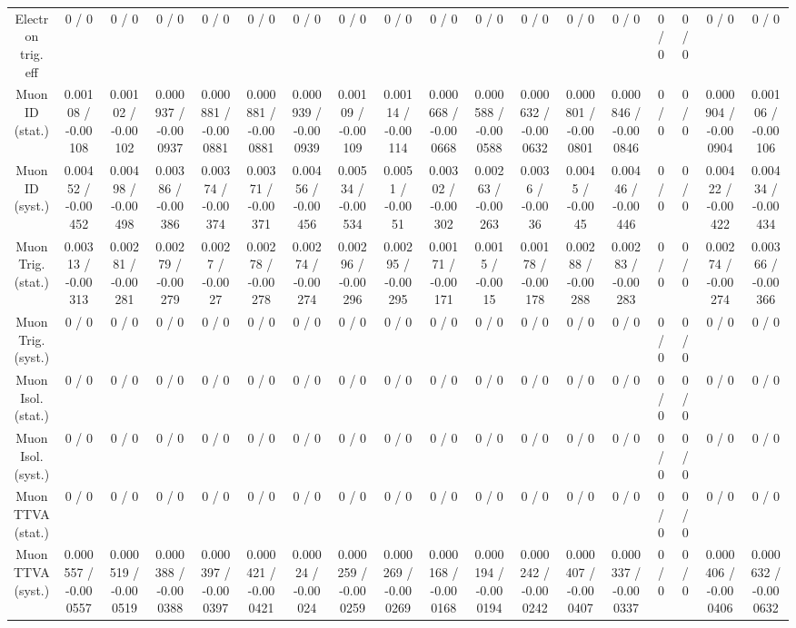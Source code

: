 \documentclass[10pt]{article}
\begin{document}
\begin{table}[htbp]
\begin{center}
\begin{tabular}{|c|c|c|c|c|c|c|c|c|c|c|c|c|c|c|c|c|c|}
  Electron trig. eff & 0 / 0 & 0 / 0 & 0 / 0 & 0 / 0 & 0 / 0 & 0 / 0 & 0 / 0 & 0 / 0 & 0 / 0 & 0 / 0 & 0 / 0 & 0 / 0 & 0 / 0 & 0 / 0 & 0 / 0 & 0 / 0 & 0 / 0 \\ 
  Muon ID (stat.) & 0.00108 / -0.00108 & 0.00102 / -0.00102 & 0.000937 / -0.000937 & 0.000881 / -0.000881 & 0.000881 / -0.000881 & 0.000939 / -0.000939 & 0.00109 / -0.00109 & 0.00114 / -0.00114 & 0.000668 / -0.000668 & 0.000588 / -0.000588 & 0.000632 / -0.000632 & 0.000801 / -0.000801 & 0.000846 / -0.000846 & 0 / 0 & 0 / 0 & 0.000904 / -0.000904 & 0.00106 / -0.00106 \\ 
  Muon ID (syst.) & 0.00452 / -0.00452 & 0.00498 / -0.00498 & 0.00386 / -0.00386 & 0.00374 / -0.00374 & 0.00371 / -0.00371 & 0.00456 / -0.00456 & 0.00534 / -0.00534 & 0.0051 / -0.0051 & 0.00302 / -0.00302 & 0.00263 / -0.00263 & 0.0036 / -0.0036 & 0.0045 / -0.0045 & 0.00446 / -0.00446 & 0 / 0 & 0 / 0 & 0.00422 / -0.00422 & 0.00434 / -0.00434 \\ 
  Muon Trig. (stat.) & 0.00313 / -0.00313 & 0.00281 / -0.00281 & 0.00279 / -0.00279 & 0.0027 / -0.0027 & 0.00278 / -0.00278 & 0.00274 / -0.00274 & 0.00296 / -0.00296 & 0.00295 / -0.00295 & 0.00171 / -0.00171 & 0.0015 / -0.0015 & 0.00178 / -0.00178 & 0.00288 / -0.00288 & 0.00283 / -0.00283 & 0 / 0 & 0 / 0 & 0.00274 / -0.00274 & 0.00366 / -0.00366 \\ 
  Muon Trig. (syst.) & 0 / 0 & 0 / 0 & 0 / 0 & 0 / 0 & 0 / 0 & 0 / 0 & 0 / 0 & 0 / 0 & 0 / 0 & 0 / 0 & 0 / 0 & 0 / 0 & 0 / 0 & 0 / 0 & 0 / 0 & 0 / 0 & 0 / 0 \\ 
  Muon Isol. (stat.) & 0 / 0 & 0 / 0 & 0 / 0 & 0 / 0 & 0 / 0 & 0 / 0 & 0 / 0 & 0 / 0 & 0 / 0 & 0 / 0 & 0 / 0 & 0 / 0 & 0 / 0 & 0 / 0 & 0 / 0 & 0 / 0 & 0 / 0 \\ 
  Muon Isol. (syst.) & 0 / 0 & 0 / 0 & 0 / 0 & 0 / 0 & 0 / 0 & 0 / 0 & 0 / 0 & 0 / 0 & 0 / 0 & 0 / 0 & 0 / 0 & 0 / 0 & 0 / 0 & 0 / 0 & 0 / 0 & 0 / 0 & 0 / 0 \\ 
  Muon TTVA (stat.) & 0 / 0 & 0 / 0 & 0 / 0 & 0 / 0 & 0 / 0 & 0 / 0 & 0 / 0 & 0 / 0 & 0 / 0 & 0 / 0 & 0 / 0 & 0 / 0 & 0 / 0 & 0 / 0 & 0 / 0 & 0 / 0 & 0 / 0 \\ 
  Muon TTVA (syst.) & 0.000557 / -0.000557 & 0.000519 / -0.000519 & 0.000388 / -0.000388 & 0.000397 / -0.000397 & 0.000421 / -0.000421 & 0.00024 / -0.00024 & 0.000259 / -0.000259 & 0.000269 / -0.000269 & 0.000168 / -0.000168 & 0.000194 / -0.000194 & 0.000242 / -0.000242 & 0.000407 / -0.000407 & 0.000337 / -0.000337 & 0 / 0 & 0 / 0 & 0.000406 / -0.000406 & 0.000632 / -0.000632 \\ 

\end{tabular}
\end{center}
\end{table}
\end{document}
